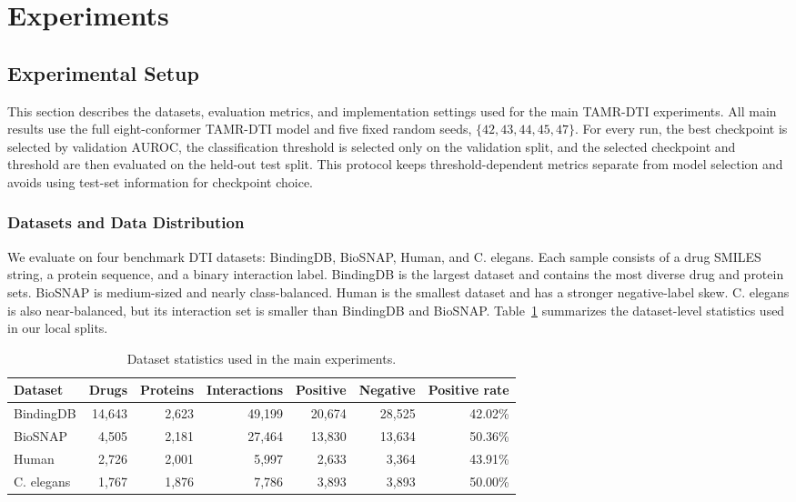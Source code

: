 \section{Experiments}
\label{sec:experiments}

\subsection{Experimental Setup}

This section describes the datasets, evaluation metrics, and implementation settings used for the main TAMR-DTI experiments. All main results use the full eight-conformer TAMR-DTI model and five fixed random seeds, $\{42,43,44,45,47\}$. For every run, the best checkpoint is selected by validation AUROC, the classification threshold is selected only on the validation split, and the selected checkpoint and threshold are then evaluated on the held-out test split. This protocol keeps threshold-dependent metrics separate from model selection and avoids using test-set information for checkpoint choice.

\subsubsection{Datasets and Data Distribution}

We evaluate on four benchmark DTI datasets: BindingDB, BioSNAP, Human, and C. elegans. Each sample consists of a drug SMILES string, a protein sequence, and a binary interaction label. BindingDB is the largest dataset and contains the most diverse drug and protein sets. BioSNAP is medium-sized and nearly class-balanced. Human is the smallest dataset and has a stronger negative-label skew. C. elegans is also near-balanced, but its interaction set is smaller than BindingDB and BioSNAP. Table~\ref{tab:dataset_overview} summarizes the dataset-level statistics used in our local splits.

\begin{table}[!htbp]
\caption{Dataset statistics used in the main experiments.}
\label{tab:dataset_overview}
\begin{center}
\begin{tabular}{lrrrrrr}
\toprule
Dataset & Drugs & Proteins & Interactions & Positive & Negative & Positive rate \\
\midrule
BindingDB & 14,643 & 2,623 & 49,199 & 20,674 & 28,525 & 42.02\% \\
BioSNAP & 4,505 & 2,181 & 27,464 & 13,830 & 13,634 & 50.36\% \\
Human & 2,726 & 2,001 & 5,997 & 2,633 & 3,364 & 43.91\% \\
C. elegans & 1,767 & 1,876 & 7,786 & 3,893 & 3,893 & 50.00\% \\
\bottomrule
\end{tabular}
\end{center}
\end{table}

